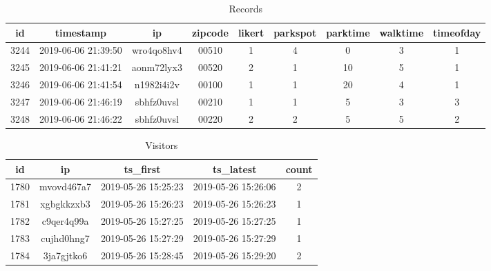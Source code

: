 \begin{table}[!htbp] %
    \begin{adjustwidth}{-1cm}{-1cm} %
        \begin{centering}
            \begin{tabular}{|c c c c c c c c c|} 
                \hline
                id & timestamp & ip & zipcode & likert & parkspot & parktime & walktime & timeofday \\ [0.5ex] 
                \hline\hline
                3244 & 2019-06-06 21:39:50 & wro4qo8hv4 & 00510 & 1 & 4 & 0 & 3 & 1\\ [0.25ex]
                \hline
                3245 & 2019-06-06 21:41:21 & aonm72lyx3 & 00520 & 2 & 1 & 10 & 5 & 1 \\ [0.25ex] 
                \hline
                3246 & 2019-06-06 21:41:54 & n1982i4i2v & 00100 & 1 & 1 & 20 & 4 & 1 \\ [0.25ex] 
                \hline
                3247 & 2019-06-06 21:46:19 & sbhfz0uvsl & 00210 & 1 & 1 & 5 & 3 & 3 \\ [0.25ex] 
                \hline
                3248 & 2019-06-06 21:46:22 & sbhfz0uvsl & 00220 & 2 & 2 & 5 & 5 & 2 \\ [1ex]
                \hline
            \end{tabular}
            \caption{Records} \label{tab:recordstab}
        \end{centering}
    \end{adjustwidth}
\end{table}

\begin{table}[!htbp]
    \begin{centering}
        \begin{tabular}{|c c c c c|} 
            \hline
            id & ip & ts\_first & ts\_latest & count \\ [0.5ex] 
            \hline\hline
            1780 & mvovd467a7 & 2019-05-26 15:25:23 & 2019-05-26 15:26:06 & 2 \\ [0.25ex] 
            \hline
            1781 & xgbgkkzxb3 & 2019-05-26 15:26:23 & 2019-05-26 15:26:23 & 1 \\ [0.25ex] 
            \hline
            1782 & c9qer4q99a & 2019-05-26 15:27:25 & 2019-05-26 15:27:25 & 1 \\ [0.25ex]
            \hline
            1783 & cujhd0hng7 & 2019-05-26 15:27:29 & 2019-05-26 15:27:29 & 1 \\ [0.25ex] 
            \hline
            1784 & 3ja7gjtko6 & 2019-05-26 15:28:45 & 2019-05-26 15:29:20 & 2 \\ [1ex]
            \hline
        \end{tabular}
        \caption{Visitors} \label{tab:visitortab}
    \end{centering}
\end{table}

